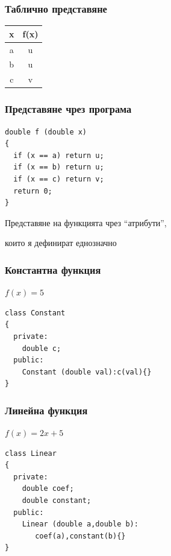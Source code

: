 \documentclass{beamer}
\begin{document}
\begin{frame}[fragile]
\frametitle{Таблично представяне}

\begin{center}
\begin{tabular}{c | c}
x & f(x) \\\hline
a & u \\
b & u \\
c & v
\end{tabular}

\end{center}


\end{frame}


\begin{frame}[fragile]
\frametitle{Представяне чрез програма}

\begin{center}
\begin{lstlisting}
double f (double x)
{
  if (x == a) return u;
  if (x == b) return u;
  if (x == c) return v;
  return 0;
}
\end{lstlisting}

\end{center}


\end{frame}


\begin{frame}
\centerline{Представяне на функцията чрез ``атрибути'',}
\centerline{които я дефинират еднозначно}
\end{frame}


\begin{frame}[fragile]
\frametitle{Константна функция}

\begin{center}

$f(x) = 5$

\begin{lstlisting}
class Constant
{
  private:
    double c;
  public:
    Constant (double val):c(val){}
}
\end{lstlisting}

\end{center}


\end{frame}


\begin{frame}[fragile]
\frametitle{Линейна функция}

\begin{center}

$f(x) = 2x + 5$

\begin{lstlisting}
class Linear
{
  private:
    double coef;
    double constant;
  public:
    Linear (double a,double b):
       coef(a),constant(b){}
}
\end{lstlisting}

\end{center}


\end{frame}
\end{document}
